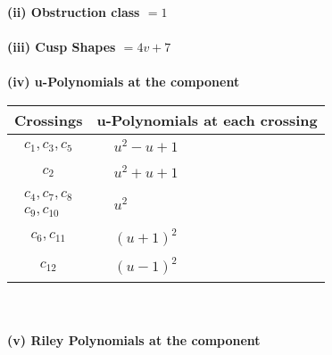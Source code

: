 \documentclass[1p]{elsarticle_modified}
\theoremstyle{definition}
\begin{document}
\flushleft \textbf{(ii) Obstruction class $= 1$}\\~\\
\flushleft \textbf{(iii) Cusp Shapes $= 4 v+7$}\\~\\
\newpage\renewcommand{\arraystretch}{1}
\flushleft \textbf{(iv) u-Polynomials at the component}\newline \\
\begin{tabular}{m{50pt}|m{274pt}}
Crossings & \hspace{64pt}u-Polynomials at each crossing \\
\hline $$\begin{aligned}c_{1},c_{3},c_{5}\end{aligned}$$&$\begin{aligned}
&u^2- u+1
\end{aligned}$\\
\hline $$\begin{aligned}c_{2}\end{aligned}$$&$\begin{aligned}
&u^2+u+1
\end{aligned}$\\
\hline $$\begin{aligned}c_{4},c_{7},c_{8}\\c_{9},c_{10}\end{aligned}$$&$\begin{aligned}
&u^2
\end{aligned}$\\
\hline $$\begin{aligned}c_{6},c_{11}\end{aligned}$$&$\begin{aligned}
&(u+1)^2
\end{aligned}$\\
\hline $$\begin{aligned}c_{12}\end{aligned}$$&$\begin{aligned}
&(u-1)^2
\end{aligned}$\\
\hline
\end{tabular}\\~\\
\newpage\renewcommand{\arraystretch}{1}
\flushleft \textbf{(v) Riley Polynomials at the component}\newline \\
\end{document}
